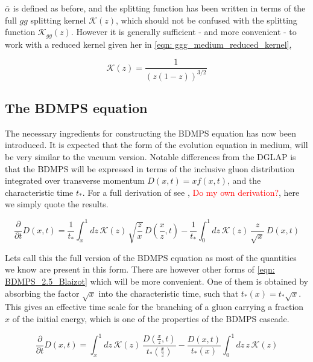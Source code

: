 \documentclass[main.tex]{subfiles}
\begin{document}
\(\bar \alpha\) is defined as before, and the splitting function has been written in terms of the full \(gg\) splitting kernel \(\mathcal{K}(z)\), which should not be confused with the splitting function \(\mathcal{K}_{gg}(z)\). However it is generally sufficient - and more convenient - to work with a reduced kernel given her in \autoref{eqn: ggg_medium_reduced_kernel}, 

\begin{equation}\label{eqn: ggg_medium_reduced_kernel}
    \mathcal{K}(z) = \frac{1}{\left( z(1-z)\right)^{3/2}}
\end{equation}


\subsection{The BDMPS equation}\label{sec: BDMPS_theory}
The necessary ingredients for constructing the BDMPS equation has now been introduced. It is expected that the form of the evolution equation in medium, will be very similar to the vacuum version. Notable differences from the DGLAP is that the BDMPS will be expressed in terms of the inclusive gluon distribution integrated over transverse momentum \(D(x,t) = x f(x,t)\), and the characteristic time \(t_*\). For a full derivation of see \cite{Probabilistic_picture_for_medium-induced_jet_evolution}, \textcolor{red}{Do my own derivation?}, here we simply quote the results. 

\begin{equation}\label{eqn: BDMPS_2.5_Blaizot}
    \frac{\partial}{\partial t} D(x,t) = \frac{1}{t_*} \int_x^1 dz\, \mathcal{K}(z)\, \sqrt{\frac{z}{x}}\, D\left(\frac{x}{z}, t\right) -\frac{1}{t_*} \int_0^1 dz\, \mathcal{K}(z)\, \frac{z}{\sqrt{x}}\, D\left(x,t\right)
\end{equation}

Lets call this the full version of the BDMPS equation as most of the quantities we know are present in this form. 
There are however other forms of \autoref{eqn: BDMPS_2.5_Blaizot} which will be more convenient. One of them is obtained by absorbing the factor \(\sqrt{x}\) into the characteristic time, such that \(t_*(x) = t_* \sqrt{x}\). This gives an effective time scale for the branching of a gluon carrying a fraction \(x\) of the initial energy, which is one of the properties of the BDMPS cascade.

\begin{equation}\label{eqn: BDMPS_2.8_Blaizot}
    \frac{\partial}{\partial t} D(x,t) = \int_x^1 dz\, \mathcal{K}(z)\, \frac{D\left(\frac{x}{z}, t\right)}{t_*(\frac{x}{z})} - \frac{D\left(x,t\right)}{t_*(x)} \int_0^1 dz\, z\, \mathcal{K}(z)
\end{equation}
\end{document}
